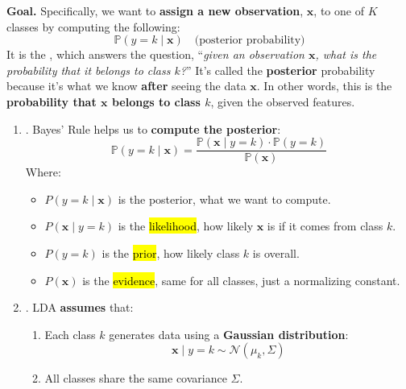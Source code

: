 \highspace
\textcolor{Red2}{ \textbf{Goal.}} Specifically, we want to \textbf{assign a new observation}, $\mathbf{x}$, to one of $K$ classes by computing the following:
\begin{equation}
    \mathbb{P}(y = k \mid \mathbf{x}) \quad \text{(posterior probability)}
\end{equation}
It is the , which answers the question, ``\emph{given an observation $\mathbf{x}$, what is the probability that it belongs to class $k$?}'' It's called the \textbf{posterior} probability because it's what we know \textbf{after} seeing the data $\mathbf{x}$. In other words, this is the \textbf{probability that $\mathbf{x}$ belongs to class $k$}, given the observed features.
\begin{enumerate}
    \item {}. Bayes' Rule helps us to \textbf{compute the posterior}:
    \begin{equation*}
        \mathbb{P}\left(y = k \mid \mathbf{x}\right) = \frac{\mathbb{P}\left(\mathbf{x} \mid y = k\right) \cdot \mathbb{P}\left(y = k\right)}{\mathbb{P}(\mathbf{x})}
    \end{equation*}
    Where:
    \begin{itemize}
        \item $P\left(y = k \mid \mathbf{x}\right)$ is the posterior, what we want to compute.
        \item $P\left(\mathbf{x} \mid y = k\right)$ is the \hl{likelihood}, how likely $\mathbf{x}$ is if it comes from class $k$.
        \item $P\left(y = k\right)$ is the \hl{prior}, how likely class $k$ is overall.
        \item $P\left(\mathbf{x}\right)$ is the \hl{evidence}, same for all classes, just a normalizing constant.
    \end{itemize}


    \item {}. LDA \textbf{assumes} that:
    \begin{enumerate}
        \item Each class $k$ generates data using a \textbf{Gaussian distribution}:
        \begin{equation*}
            \mathbf{x} \mid y = k \sim \mathcal{N}(\mu_{k}, \Sigma)
        \end{equation*}
        
        \item All classes share the same covariance $\Sigma$.


\end{enumerate}
\end{enumerate}
